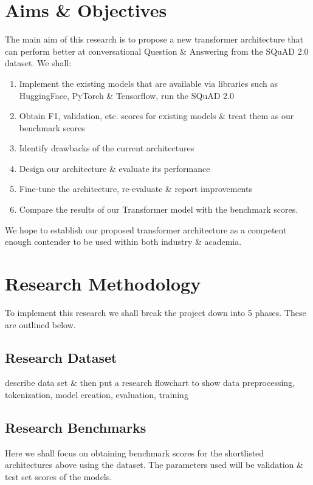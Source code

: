 \documentclass[11pt]{article}
\begin{document}
\newpage
\newpage
\section{Aims \& Objectives}\label{aims}

The main aim of this research is to propose a new transformer architecture that can perform better at conversational Question \& Answering from the SQuAD 2.0 dataset\citep{dataset}.
We shall:
\begin{enumerate}
    \item Implement the existing models that are available via libraries such as HuggingFace\citep{hfTransformers}, PyTorch \& Tensorflow, run the SQuAD 2.0\citep{dataset}
    \item Obtain F1, validation, etc. scores for existing models \& treat them as our benchmark scores
    \item Identify drawbacks of the current architectures
    \item Design our architecture \& evaluate its performance
    \item Fine-tune the architecture, re-evaluate \& report improvements
    \item Compare the results of our Transformer model with the benchmark scores.
\end{enumerate}
We hope to establish our proposed transformer architecture as a competent enough contender to be used within both industry \& academia.
\section{Research Methodology}\label{researchMeth}

To implement this research we shall break the project down into 5 phases. These are outlined below.
\subsection{Research Dataset}\label{datas}

describe data set \& then put a research flowchart to show data preprocessing, tokenization, model creation, evaluation, training
\subsection{Research Benchmarks}\label{benchmarks}
Here we shall focus on obtaining benchmark scores for the shortlisted architectures above using the dataset\citep{dataset}. The parameters used will be validation \& test set scores of the models.
\end{document}

